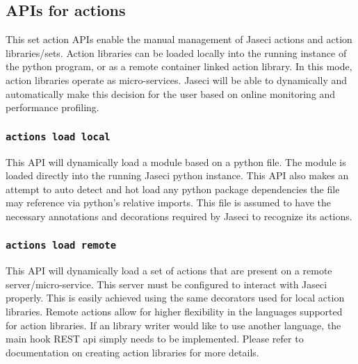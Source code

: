 \subsection{APIs for actions}

\par
This set action APIs enable the manual management of Jaseci actions and action
libraries/sets. Action libraries can be loaded locally into the running instance of
the python program, or as a remote container linked action library. In this mode,
action libraries operate as micro-services. Jaseci will be able to dynamically
and automatically make this decision for the user based on online monitoring and
performance profiling.

\subsubsection{\lstinline[basicstyle=\Large\ttfamily]$actions load local$}

{This API will dynamically load a module based on a python file. The module
is loaded directly into the running Jaseci python instance. This API also
makes an attempt to auto detect and hot load any python package dependencies
the file may reference via python's relative imports. This file is assumed to
have the necessary annotations and decorations required by Jaseci to recognize
its actions.\vspace{4mm}\par
{}}
\subsubsection{\lstinline[basicstyle=\Large\ttfamily]$actions load remote$}

{This API will dynamically load a set of actions that are present on a remote
server/micro-service. This server must be configured to interact with Jaseci
properly. This is easily achieved using the same decorators used for local
action libraries. Remote actions allow for higher flexibility in the languages
supported for action libraries. If an  library writer would like to use another
language, the main hook REST api simply needs to be implemented. Please
refer to documentation on creating action libraries for more details.\vspace{4mm}\par
{}}
